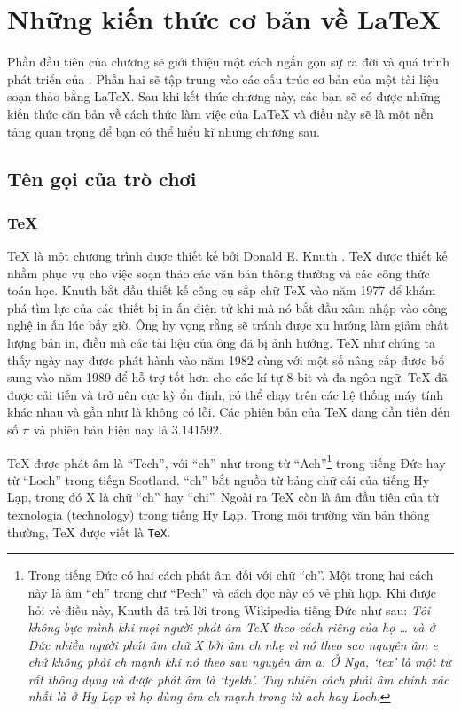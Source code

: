 
\chapter{Những kiến thức cơ bản về \LaTeX{}}

\begin{intro}
  Phần đầu tiên của chương sẽ giới thiệu một cách ngắn gọn sự ra đời
  và quá trình phát triển của \LaTeXe{}. Phần hai sẽ tập trung vào các
  cấu trúc cơ bản của một tài liệu soạn thảo bằng \LaTeX{}. Sau khi
  kết thúc chương này, các bạn sẽ có được những kiến thức căn bản về
  cách thức làm việc của \LaTeX{} và điều này sẽ là một nền tảng quan
  trọng để bạn có thể hiểu kĩ những chương sau.
\end{intro}

\section{Tên gọi của trò chơi}
\subsection{\TeX} \TeX{} là một chương trình được thiết kế bởi 
 Donald E. Knuth \cite{texbook}. \TeX{} được
thiết kế nhằm phục vụ cho việc soạn thảo các văn bản thông thường và
các công thức toán học. Knuth bắt đầu thiết kế công cụ sắp chữ \TeX{}
vào năm 1977 để khám phá tìm lực của các thiết bị in ấn điện tử khi mà
nó bắt đầu xâm nhập vào công nghệ in ấn lúc bấy giờ. Ông hy vọng rằng
sẽ tránh được xu hướng làm giảm chất lượng bản in, điều mà các tài
liệu của ông đã bị ảnh hưởng. \TeX{} như chúng ta thấy ngày nay được
phát hành vào năm 1982 cùng với một số nâng cấp được bổ sung vào năm
1989 để hỗ trợ tốt hơn cho các kí tự 8-bit và đa ngôn ngữ. \TeX{} đã
được cải tiến và trở nên cực kỳ ổn định, có thể chạy trên các hệ thống
máy tính khác nhau và gần như là không có lỗi. Các phiên bản của
\TeX{} đang dần tiến đến số $\pi$ và phiên bản hiện nay là $3.141592$.

\TeX{} được phát âm là ``Tech'', với ``ch'' như trong từ
``Ach''\footnote{Trong tiếng Đức có hai cách phát âm đối với chữ
  ``ch''. Một trong hai cách này là âm ``ch'' trong chữ ``Pech'' và
  cách đọc này có vẻ phù hợp. Khi được hỏi vè điều này, Knuth đã trả
  lời trong Wikipedia tiếng Đức như sau: \emph{Tôi không bực mình khi
    mọi người phát âm \TeX{} theo cách riêng của họ \ldots{} và ở Đức
    nhiều người phát âm chữ X bởi âm ch nhẹ vì nó theo sao nguyên âm e
    chứ không phải ch mạnh khi nó theo sau nguyên âm a. Ở Nga, `tex'
    là một từ rất thông dụng và được phát âm là `tyekh'. Tuy nhiên
    cách phát âm chính xác nhất là ở Hy Lạp vì họ dùng âm ch mạnh
    trong từ ach hay Loch.}} trong tiếng Đức hay từ ``Loch'' trong
tiếgn Scotland. ``ch'' bắt nguồn từ bảng chữ cái của tiếng Hy Lạp,
trong đó X là chữ ``ch'' hay ``chi''. Ngoài ra \TeX{} còn là âm đầu
tiên của từ texnologia (technology) trong tiếng Hy Lạp. Trong môi
trường văn bản thông thường, \TeX{} được viết là \texttt{TeX}.

